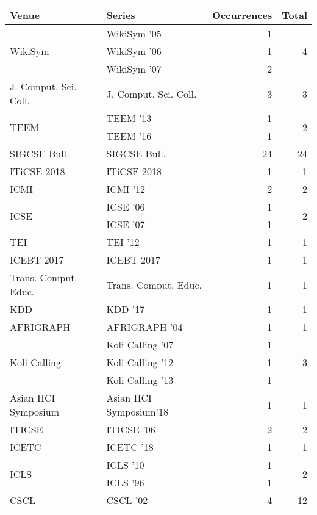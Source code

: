 \begin{table*}[t]
\begin{tabular}{llrr}
Venue & Series & Occurrences & Total\\\hline
\multirow{3}{*}{WikiSym } & WikiSym '05 & 1 & \multirow{3}{*}{4}\\
& WikiSym '06 & 1 &\\
& WikiSym '07 & 2 &\\
\multirow{1}{*}{J. Comput. Sci. Coll.} & J. Comput. Sci. Coll. & 3 & \multirow{1}{*}{3}\\
\multirow{2}{*}{TEEM } & TEEM '13 & 1 & \multirow{2}{*}{2}\\
& TEEM '16 & 1 &\\
\multirow{1}{*}{SIGCSE Bull.} & SIGCSE Bull. & 24 & \multirow{1}{*}{24}\\
\multirow{1}{*}{ITiCSE 2018} & ITiCSE 2018 & 1 & \multirow{1}{*}{1}\\
\multirow{1}{*}{ICMI } & ICMI '12 & 2 & \multirow{1}{*}{2}\\
\multirow{2}{*}{ICSE } & ICSE '06 & 1 & \multirow{2}{*}{2}\\
& ICSE '07 & 1 &\\
\multirow{1}{*}{TEI } & TEI '12 & 1 & \multirow{1}{*}{1}\\
\multirow{1}{*}{ICEBT 2017} & ICEBT 2017 & 1 & \multirow{1}{*}{1}\\
\multirow{1}{*}{Trans. Comput. Educ.} & Trans. Comput. Educ. & 1 & \multirow{1}{*}{1}\\
\multirow{1}{*}{KDD } & KDD '17 & 1 & \multirow{1}{*}{1}\\
\multirow{1}{*}{AFRIGRAPH } & AFRIGRAPH '04 & 1 & \multirow{1}{*}{1}\\
\multirow{3}{*}{Koli Calling } & Koli Calling '07 & 1 & \multirow{3}{*}{3}\\
& Koli Calling '12 & 1 &\\
& Koli Calling '13 & 1 &\\
\multirow{1}{*}{Asian HCI Symposium} & Asian HCI Symposium'18 & 1 & \multirow{1}{*}{1}\\
\multirow{1}{*}{ITICSE } & ITICSE '06 & 2 & \multirow{1}{*}{2}\\
\multirow{1}{*}{ICETC } & ICETC '18 & 1 & \multirow{1}{*}{1}\\
\multirow{2}{*}{ICLS } & ICLS '10 & 1 & \multirow{2}{*}{2}\\
& ICLS '96 & 1 &\\
\multirow{4}{*}{CSCL } & CSCL '02 & 4 & \multirow{4}{*}{12}\\

\end{tabular}
\end{table*}
